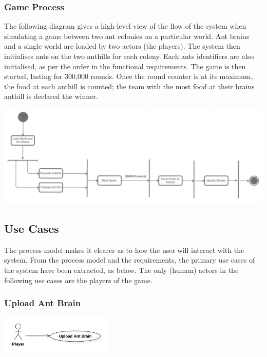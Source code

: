 \documentclass[11pt]{article}
\begin{document}
\subsubsection{Game Process}\label{game-process}

The following diagram gives a high-level view of the flow of the system
when simulating a game between two ant colonies on a particular world.
Ant brains and a single world are loaded by two actors (the players).
The system then initialises ants on the two anthills for each colony.
Each ants identifiers are also initialised, as per the order in the
functional requirements. The game is then started, lasting for 300,000
rounds. Once the round counter is at its maximum, the food at each
anthill is counted; the team with the most food at their brains anthill
is declared the winner.

\begin{center}
\includegraphics[width=\textwidth]{high-level-diagrams/process-model-game.png}
\end{center}

\subsection{Use Cases}\label{use-cases}

The process model makes it clearer as to how the user will interact with
the system. From the process model and the requirements, the primary use
cases of the system have been extracted, as below. The only (human)
actors in the following use cases are the players of the game.

\subsubsection{Upload Ant Brain}\label{upload-ant-brain}

\begin{center}
\includegraphics[width=0.4\textwidth]{high-level-diagrams/use-case-1-upload-ant-brain.png}
\end{center}
\end{document}
